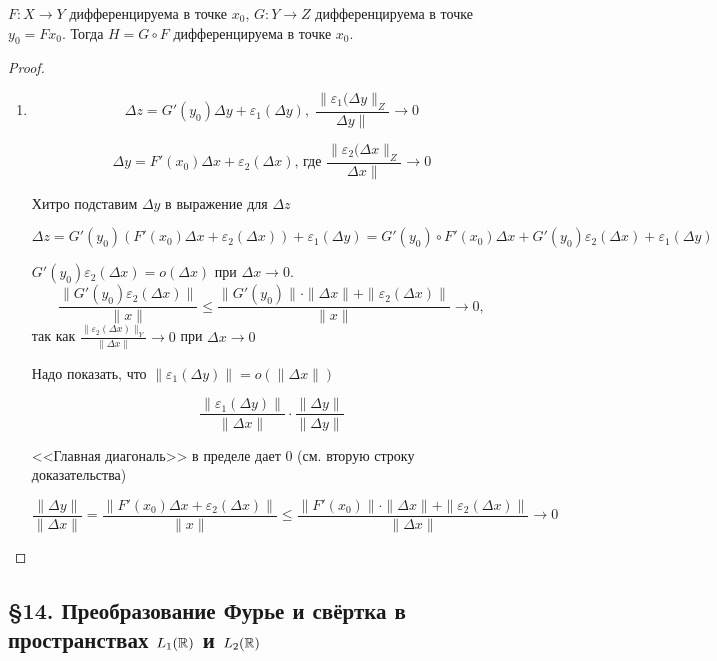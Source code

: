 \begin{statement}
    $F: X \to Y$ дифференцируема в точке $x_0$, $G: Y \to Z$ дифференцируема в точке $y_0 = F x_0$. Тогда $H = G \circ F$ дифференцируема в точке $x_0$.
\end{statement}
\begin{proof}
    \begin{enumerate}
        \item \[ \Delta z = G'(y_0) \Delta y + \varepsilon_1(\Delta y), \; \frac{\|\varepsilon_1(\Delta y\|_Z}{\Delta y \|} \to 0 \]

        \[
        \Delta y = F'(x_0) \Delta x + \varepsilon_2(\Delta x) \text{, где } \frac{\|\varepsilon_2(\Delta x\|_Z}{\Delta x \|} \to 0
        \]

        Хитро подставим $\Delta y$ в выражение для $\Delta z$

        \[ 
        \Delta z = G'(y_0)(F'(x_0) \Delta x + \varepsilon_2(\Delta x)) + \varepsilon_1(\Delta y)=G'(y_0) \circ F'(x_0) \Delta x + G'(y_0) \varepsilon_2(\Delta x) + \varepsilon_1(\Delta y)
        \]

        $G'(y_0) \varepsilon_2(\Delta x) = o(\Delta x)$ при $\Delta x \to 0$.
        \[
        \frac{\|G'(y_0) \varepsilon_2(\Delta x)\|}{\|x\|}
        \leqslant \frac{\|G'(y_0)\| \cdot \|\Delta x\| + \|\varepsilon_2(\Delta x)\|}{\|x\|} \to 0,
        \]
        так как $\frac{\| \varepsilon_2(\Delta x) \|_Y}{\| \Delta x \|} \to 0$ при $\Delta x \to 0$
        
        Надо показать, что $\|\varepsilon_1(\Delta y)\| = o(\|\Delta x\|)$ 

        \[
        \frac{\|\varepsilon_1(\Delta y)\|}{\|\Delta x\|} \cdot \frac{\|\Delta y\|}{\|\Delta y\|}
        \]
        
        <<Главная диагональ>> в пределе дает 0 (см. вторую строку доказательства)
        
        \[
        \frac{\|\Delta y\|}{\|\Delta x\|} = 
        \frac{\|F'(x_0) \Delta x + \varepsilon_2(\Delta x)\|}{\|x\|} \leqslant 
        \frac{\|F'(x_0)\| \cdot \|\Delta x\| + \|\varepsilon_2(\Delta x)\|}{\|\Delta x\|} \to 0
        \]
        
    \end{enumerate}
\end{proof}

\subsection{§14. Преобразование Фурье и свёртка в пространствах $L_1(\mathbb{R})$ и $L_2(\mathbb{R})$}

